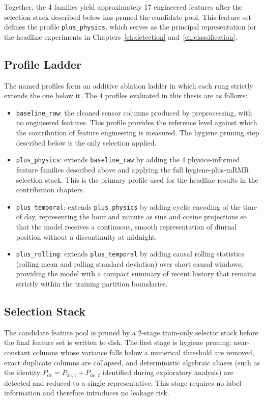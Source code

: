 Together, the 4 families yield approximately 17 engineered features after the selection stack described below has pruned the candidate pool. This feature set defines the profile \texttt{plus\_physics}, which serves as the principal representation for the headline experiments in Chapters~\ref{ch:detection} and~\ref{ch:classification}.

\subsection{Profile Ladder}

The named profiles form an additive ablation ladder in which each rung strictly extends the one below it. The 4 profiles evaluated in this thesis are as follows:

\begin{itemize}
    \item \texttt{baseline\_raw}: the cleaned sensor columns produced by preprocessing, with no engineered features. This profile provides the reference level against which the contribution of feature engineering is measured. The hygiene pruning step described below is the only selection applied.
    \item \texttt{plus\_physics}: extends \texttt{baseline\_raw} by adding the 4 physics-informed feature families described above and applying the full hygiene-plus-mRMR selection stack. This is the primary profile used for the headline results in the contribution chapters.
    \item \texttt{plus\_temporal}: extends \texttt{plus\_physics} by adding cyclic encoding of the time of day, representing the hour and minute as sine and cosine projections so that the model receives a continuous, smooth representation of diurnal position without a discontinuity at midnight.
    \item \texttt{plus\_rolling}: extends \texttt{plus\_temporal} by adding causal rolling statistics (rolling mean and rolling standard deviation) over short causal windows, providing the model with a compact summary of recent history that remains strictly within the training partition boundaries.
\end{itemize}

\subsection{Selection Stack}

The candidate feature pool is pruned by a 2-stage train-only selector stack before the final feature set is written to disk. The first stage is hygiene pruning: near-constant columns whose variance falls below a numerical threshold are removed, exact duplicate columns are collapsed, and deterministic algebraic aliases (such as the identity $P_{\mathrm{dc}} = P_{\mathrm{dc},1} + P_{\mathrm{dc},2}$ identified during exploratory analysis) are detected and reduced to a single representative. This stage requires no label information and therefore introduces no leakage risk.

